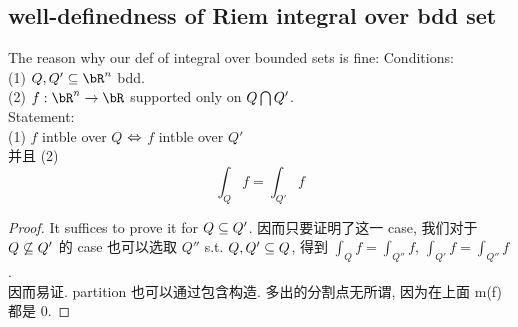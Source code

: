 \subsection{well-definedness of Riem integral over bdd set}
\begin{lemma}{The reason why our def of integral over bounded sets is fine:}
    Conditions:\\
    (1) $Q, Q' \sub \bR^n$ bdd.\\
    (2) $f: \bR^n \rar \bR$ supported only on $Q \bigcap Q'$.\\
    Statement:\\
    (1) $f$ intble over $Q$ $\Leftrightarrow$ $f$ intble over $Q'$ \\
    并且 (2)
    $$
    \int_Q f = \int_{Q'} f 
    $$
\end{lemma}
\begin{proof}
    It suffices to prove it for $Q \subseteq Q'$. 因而只要证明了这一 case, 我们对于 $Q \not \subseteq Q'$ 的 case 也可以选取 $Q''$ s.t. $Q, Q' \subseteq Q$, 得到 $\int_Q f = \int_{Q''}f$, $\int_{Q'} f = \int_{Q''} f$.\\
    因而易证. partition 也可以通过包含构造. 多出的分割点无所谓, 因为在上面 m(f) 都是 0.
\end{proof}



